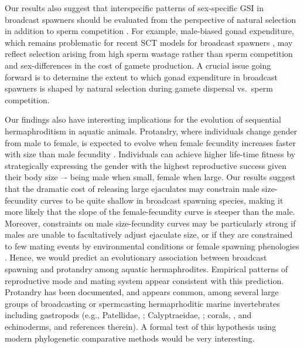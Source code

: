 \documentclass{article}
\begin{document}
Our results also suggest that interspecific patterns of sex-specific GSI in broadcast spawners should be evaluated from the perspective of natural selection in addition to sperm competition \citep{Parker2017}. For example, male-biased gonad expenditure, which remains problematic for recent SCT models for broadcast spawners \citep{Parker2017}, may reflect selection arising from high sperm wastage rather than sperm competition and sex-differences in the cost of gamete production. A crucial issue going forward is to determine the extent to which gonad expenditure in broadcast spawners is shaped by natural selection during gamete dispersal vs.~sperm competition. 

Our findings also have interesting implications for the evolution of sequential hermaphroditism in aquatic animals. Protandry, where individuals change gender from male to female, is expected to evolve when female fecundity increases faster with size than male fecundity \citep{Ghiselin1969, Warner1975, Warner1988, MundayWarner2006}. Individuals can achieve higher life-time fitness by strategically expressing the gender with the highest reproductive success given their body size –- being male when small, female when large. Our results suggest that the dramatic cost of releasing large ejaculates may constrain male size-fecundity curves to be quite shallow in broadcast spawning species, making it more likely that the slope of the female-fecundity curve is steeper than the male. Moreover, constraints on male size-fecundity curves may be particularly strong if males are unable to facultatively adjust ejaculate size, or if they are constrained to few mating events by environmental conditions or female spawning phenologies \citep{Olito2015, Olito2017}. Hence, we would predict an evolutionary association between broadcast spawning and protandry among aquatic hermaphrodites. Empirical patterns of reproductive mode and mating system appear consistent with this prediction. Protandry has been documented, and appears common, among several large groups of broadcasting or spermcasting hermaprhoditic marine invertebrates including gastropods (e.g., Patellidae, \citealt{QuesneHawkins2006}; Calyptraeidae, \citealt{Coe1936}; corals, \citealt{LoyaSakai2008}, and echinoderms, \citealt{Sewell1994} and references therein). A formal test of this hypothesis using modern phylogenetic comparative methods would be very interesting.



\end{document}
